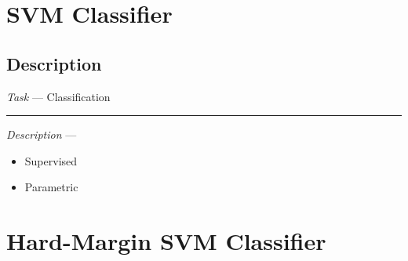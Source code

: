 \section{SVM Classifier}
\subsection*{Description}
\emph{Task} --- Classification

{\color{lightgray}\hrule height 0.001mm}

\emph{Description} --- 
\begin{itemize}
    \item Supervised
    \item Parametric
\end{itemize}

\section{Hard-Margin SVM Classifier}
